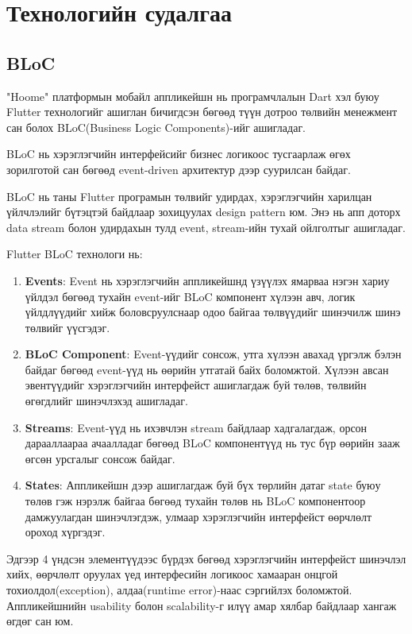 \chapter{Технологийн судалгаа}
\section{BLoC}
"Hoome" платформын мобайл аппликейшн нь програмчлалын Dart хэл буюу Flutter технологийг ашиглан бичигдсэн бөгөөд түүн дотроо төлвийн менежмент сан болох BLoC(Business Logic Components)-ийг ашигладаг. 

BLoC нь хэрэглэгчийн интерфейсийг бизнес логикоос тусгаарлаж өгөх зорилготой сан бөгөөд event-driven архитектур дээр суурилсан байдаг. 

BLoC нь таны Flutter програмын төлвийг удирдах, хэрэглэгчийн харилцан үйлчлэлийг бүтэцтэй байдлаар зохицуулах design pattern юм. Энэ нь апп доторх data stream болон удирдахын тулд event, stream-ийн тухай ойлголтыг ашигладаг.

Flutter BLoC технологи нь:

\begin{enumerate}
  \item \textbf{Events}: Event нь хэрэглэгчийн аппликейшнд үзүүлэх ямарваа нэгэн хариу үйлдэл бөгөөд тухайн event-ийг BLoC компонент хүлээн авч, логик үйлдлүүдийг хийж боловсруулснаар одоо байгаа төлвүүдийг шинэчилж шинэ төлвийг үүсгэдэг.
  \item \textbf{BLoC Component}: Event-үүдийг сонсож, утга хүлээн авахад үргэлж бэлэн байдаг бөгөөд event-үүд нь өөрийн утгатай байх боломжтой. Хүлээн авсан эвентүүдийг хэрэглэгчийн интерфейст ашиглагдаж буй төлөв, төлвийн өгөгдлийг шинэчлэхэд ашигладаг.
  \item \textbf{Streams}: Event-үүд нь ихэвчлэн stream байдлаар хадгалагдаж, орсон дарааллаараа ачаалладаг бөгөөд BLoC компонентүүд нь тус бүр өөрийн зааж өгсөн урсгалыг сонсож байдаг.
  \item \textbf{States}: Аппликейшн дээр ашиглагдаж буй бүх төрлийн датаг state буюу төлөв гэж нэрэлж байгаа бөгөөд тухайн төлөв нь BLoC компонентоор дамжуулагдан шинэчлэгдэж, улмаар хэрэглэгчийн интерфейст өөрчлөлт ороход хүргэдэг. 
\end{enumerate}

Эдгээр 4 үндсэн элементүүдээс бүрдэх бөгөөд хэрэглэгчийн интерфейст шинэчлэл хийх, өөрчлөлт оруулах үед интерфесийн логикоос хамааран онцгой тохиолдол(exception), алдаа(runtime error)-наас сэргийлэх боломжтой. Аппликейшнийн usability болон scalability-г илүү амар хялбар байдлаар хангаж өгдөг сан юм. 